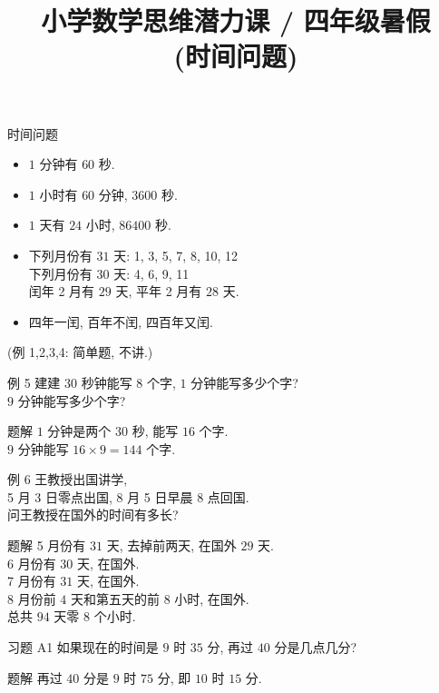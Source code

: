 \documentclass[content.tex]{subfiles}
\title{小学数学思维潜力课 / 四年级暑假 \\ (时间问题)}
\begin{document}
\begin{frame}
\maketitle
\end{frame}

\begin{frame}{时间问题}
\begin{itemize}
\item $1$ 分钟有 $60$ 秒.
\item $1$ 小时有 $60$ 分钟, $3600$ 秒.
\item $1$ 天有 $24$ 小时, $86400$ 秒.
\item 
下列月份有 $31$ 天: 1, 3, 5, 7, 8, 10, 12 \\
下列月份有 $30$ 天: 4, 6, 9, 11 \\
闰年 2 月有 $29$ 天, 平年 2 月有 $28$ 天. \\
\item 四年一闰, 百年不闰, 四百年又闰.
\end{itemize}
\bigbreak
\centering (例 1,2,3,4: 简单题, 不讲.) \\
\end{frame}

\begin{frame}{例 5}
建建 $30$ 秒钟能写 $8$ 个字, $1$ 分钟能写多少个字? \\
$9$ 分钟能写多少个字? 
\begin{exampleblock}{题解}
$1$ 分钟是两个 $30$ 秒, 能写 $16$ 个字. \\
$9$ 分钟能写 $16 \times 9 = 144$ 个字.
\end{exampleblock}
\end{frame}

\begin{frame}{例 6}
王教授出国讲学, \\
5 月 3 日零点出国, 8 月 5 日早晨 $8$ 点回国. \\
问王教授在国外的时间有多长? 
\begin{exampleblock}{题解}
5 月份有 $31$ 天, 去掉前两天, 在国外 $29$ 天. \\
6 月份有 $30$ 天, 在国外. \\
7 月份有 $31$ 天, 在国外. \\
8 月份前 $4$ 天和第五天的前 $8$ 小时, 在国外. \\
总共 $94$ 天零 $8$ 个小时.
\end{exampleblock}
\end{frame}

\begin{frame}{习题 A1}
如果现在的时间是 $9$ 时 $35$ 分, 再过 $40$ 分是几点几分?
\begin{exampleblock}{题解}
再过 $40$ 分是 $9$ 时 $75$ 分, 即 $10$ 时 $15$ 分.
\end{exampleblock}
\end{frame}
\end{document}
